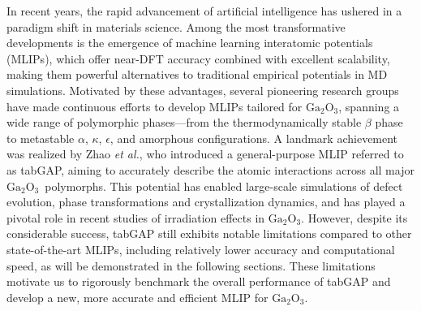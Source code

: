 \documentclass[aip,graphicx,amsmath,amssymb]{revtex4-1}
\newcommand{\ga}{$\text{Ga}_2\text{O}_3$}
\begin{document}
In recent years, the rapid advancement of artificial intelligence has ushered in a 
paradigm shift in materials science.\cite{pyzer-knapp_accelerating_2022} 
Among the most transformative developments is the emergence of machine learning interatomic 
potentials (MLIPs), which offer near-DFT accuracy combined with excellent scalability, 
making them powerful alternatives to traditional empirical potentials 
in MD simulations.\cite{ko_recent_2023} 
Motivated by these advantages, several pioneering research groups have made 
continuous efforts to develop MLIPs tailored for \ga, spanning a wide range of polymorphic 
phases---from the thermodynamically stable $\beta$ phase\cite{li_deep_2020,liu_machine_2020,zhao_phase_2021} 
to metastable $\alpha$,\cite{sun_neuroevolution_2023} $\kappa$,\cite{wang_dissimilar_2024} 
$\epsilon$,\cite{sun_neuroevolution_2023} and amorphous configurations.\cite{liu_unraveling_2023} 
A landmark achievement was realized by Zhao \textit{et al.},\cite{zhao_complex_2023} 
who introduced a general-purpose MLIP referred to as tabGAP, aiming to accurately 
describe the atomic interactions across all major \ga\ polymorphs. 
This potential has enabled large-scale simulations of 
defect evolution,\cite{he_threshold_2024,he_ultrahigh_2024,liu_orientation-dependent_2025} 
phase transformations\cite{azarov_self-assembling_2025} 
and crystallization dynamics,\cite{zhang_orientation-dependent_2023,li_edge-dependent_2025} 
and has played a pivotal role in recent studies of irradiation effects in 
\ga.\cite{azarov_universal_2023,zhao_crystallization_2025,han_electronic_2025,abdullaev_ions_2025} 
However, despite its considerable success, tabGAP still exhibits notable limitations compared 
to other state-of-the-art MLIPs, including relatively lower accuracy and computational 
speed, as will be demonstrated in the following sections. 
These limitations motivate us to rigorously benchmark the overall 
performance of tabGAP and develop a new, more accurate and efficient MLIP for \ga.
\end{document}
